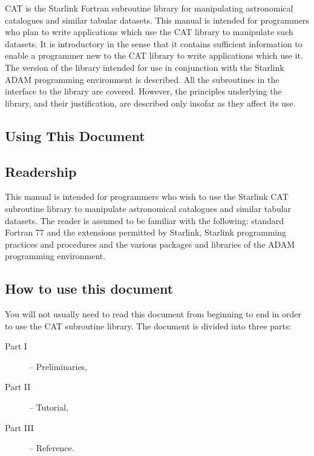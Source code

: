 CAT is the Starlink Fortran subroutine library for manipulating 
astronomical catalogues and similar tabular datasets. This manual is 
intended for programmers who plan to write applications which use the 
CAT library to manipulate such datasets. It is introductory in the 
sense that it contains sufficient information to enable a programmer new
to the CAT library to write applications which use it. The version of 
the library intended for use in conjunction with the Starlink ADAM 
programming environment is described. All the subroutines in the 
interface to the library are covered. However, the principles underlying
the library, and their justification, are described only insofar as they
affect its use.

\pagebreak
\markboth{\stardocname}{\stardocname}

\begin{htmlonly}
\section*{Using This Document}
\end{htmlonly}

\subsection*{Readership}

This manual is intended for programmers who wish to use the Starlink 
CAT subroutine library to manipulate astronomical catalogues and 
similar tabular datasets. The reader is assumed to be familiar with the 
following: standard Fortran 77 and the extensions permitted by Starlink,
Starlink programming practices and procedures and the various packages 
and libraries of the ADAM programming environment.


\subsection*{How to use this document}

You will not usually need to read this document from beginning to end in 
order to use the CAT subroutine library. The document is divided into 
three parts:

\begin{description}

   \item[{\rm Part I}] -- Preliminaries,

  \item[{\rm Part II}] -- Tutorial,

  \item[{\rm Part III}] -- Reference.

\end{description}

